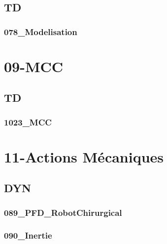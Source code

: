 \section{TD}

\subsection{078\_Modelisation}
\graphicspath{{../08-Électromécanique/TD/078_Modelisation/images/}{../08-Électromécanique/TD/078_Modelisation/}{../Style/png/}}


\clearpage
\chapter{09-MCC}

\section{TD}

\subsection{1023\_MCC}
\graphicspath{{../09-MCC/TD/1023_MCC/images/}{../09-MCC/TD/1023_MCC/}{../Style/png/}}


\clearpage
\chapter{11-Actions Mécaniques}

\section{DYN}

\subsection{089\_PFD\_RobotChirurgical}
\graphicspath{{../11-Actions Mécaniques/TD/DYN/089_PFD_RobotChirurgical/images/}{../11-Actions Mécaniques/TD/DYN/089_PFD_RobotChirurgical/}{../Style/png/}}


\subsection{090\_Inertie}
\graphicspath{{../11-Actions Mécaniques/TD/DYN/090_Inertie/images/}{../11-Actions Mécaniques/TD/DYN/090_Inertie/}{../Style/png/}}


